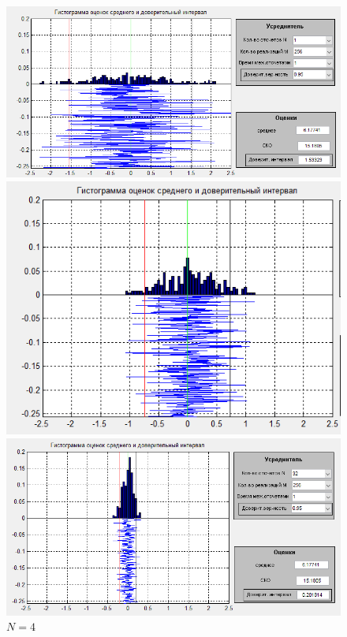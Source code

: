  \begin{figure}[H]
	\begin{minipage}{.5\linewidth}
		\centering
       \includegraphics[width=\linewidth]{fig/fig61}
	\caption*{$N = 1$}
	\end{minipage}
	\begin{minipage}{.5\linewidth}
		\centering
        \includegraphics[width=\linewidth]{fig/fig62}
	\caption*{$N = 4$}
	\end{minipage}
	\begin{minipage}{.5\linewidth}
		\centering
        \includegraphics[width=\linewidth]{fig/fig63}

\end{minipage}
\end{figure}
